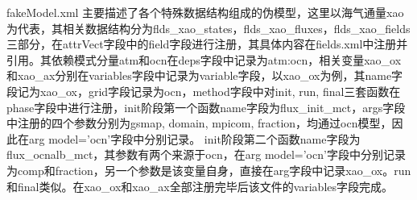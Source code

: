 fakeModel.xml 主要描述了各个特殊数据结构组成的伪模型，这里以海气通量xao为代表，其相关数据结构分为flds\_xao\_states，flds\_xao\_fluxes，flds\_xao\_fields三部分，在attrVect字段中的field字段进行注册，其具体内容在fields.xml中注册并引用。其依赖模式分量atm和ocn在deps字段中记录为atm:ocn，相关变量xao\_ox和xao\_ax分别在variables字段中记录为variable字段，以xao\_ox为例，其name字段记为xao\_ox，grid字段记录为ocn，method字段中对init, run, final三套函数在phase字段中进行注册，init阶段第一个函数name字段为flux\_init\_mct，args字段中注册的四个参数分别为gsmap, domain, mpicom, fraction，均通过ocn模型，因此在arg model='ocn'字段中分别记录。 init阶段第二个函数name字段为flux\_ocnalb\_mct，其参数有两个来源于ocn，在arg model='ocn'字段中分别记录为comp和fraction，另一个参数是该变量自身，直接在arg字段中记录xao\_ox。run和final类似。在xao\_ox和xao\_ax全部注册完毕后该文件的variables字段完成。

